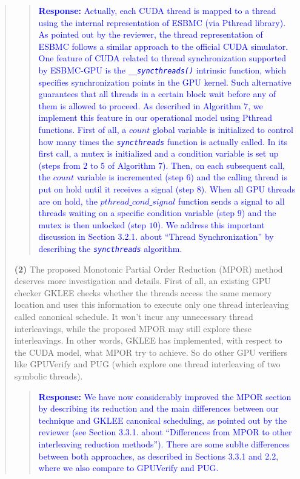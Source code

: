 \documentclass[11pt]{article}
\begin{document}
\begin{quote}
\begin{quote}
\textcolor{blue}{\textbf{Response:} Actually, each CUDA thread is mapped to a thread using the internal representation of ESBMC (via Pthread library). As pointed out by the reviewer, the thread representation of ESBMC follows a similar approach to the official CUDA simulator. One feature of CUDA related to thread synchronization supported by ESBMC-GPU is the \emph{\tt \_\_syncthreads()} intrinsic function, which specifies synchronization points in the GPU kernel. Such alternative guarantees that all threads in a certain block wait before any of them is allowed to proceed. As described in Algorithm $7$, we implement this feature in our operational model using Pthread functions. First of all, a $count$ global variable is initialized to control how many times the \emph{\tt syncthreads} function is actually called. In its first call, a mutex is initialized and a condition variable is set up (steps from $2$ to $5$ of Algorithm $7$). Then, on each subsequent call, the $count$ variable is incremented (step $6$) and the calling thread is put on hold until it receives a signal (step $8$). When all GPU threads are on hold, the $pthread\_cond\_signal$ function sends a signal to all threads waiting on a specific condition variable (step $9$) and the mutex is then unlocked (step $10$). We address this important discussion in Section 3.2.1. about ``Thread Synchronization'' by describing the \emph{\tt syncthreads} algorithm.}
\end{quote}

{\bf (2)} The proposed Monotonic Partial Order Reduction (MPOR) method deserves more investigation and details. First of all, an existing GPU checker GKLEE checks whether the threads access the same memory location and uses this information to execute only one thread interleaving called canonical schedule. It won't incur any unnecessary thread interleavings, while the proposed MPOR may still explore these interleavings. In other words, GKLEE has implemented, with respect to the CUDA model, what MPOR try to achieve. So do other GPU verifiers like GPUVerify and PUG (which explore one thread interleaving of two symbolic threads).

\begin{quote}
\textcolor{blue}{\textbf{Response:} We have now considerably improved the MPOR section by describing its reduction and the main differences between our technique and GKLEE canonical scheduling, as pointed out by the reviewer (see Section 3.3.1. about ``Differences from MPOR to other interleaving reduction methods''). There are some sublte differences between both approaches, as described in Sections 3.3.1 and 2.2, where we also compare to GPUVerify and PUG.}
\end{quote}


\end{quote}
\end{document}
